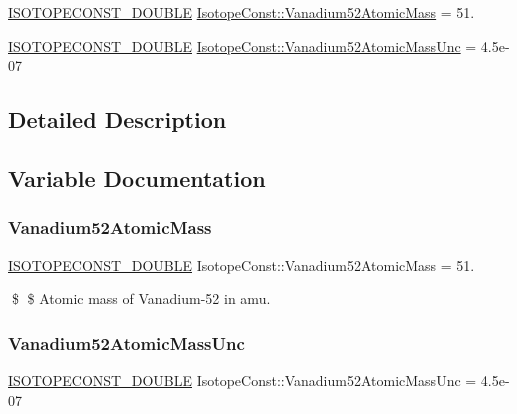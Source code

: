 \begin{DoxyCompactItemize}
\item 
\mbox{\hyperlink{group___isotope_const-_macros_ga8f45a7272ce02c0b4c65c44636ed719a}{I\+S\+O\+T\+O\+P\+E\+C\+O\+N\+S\+T\+\_\+\+D\+O\+U\+B\+LE}} \mbox{\hyperlink{group___isotope_const-_vanadium-_v52_gafeb9e60dd6d3c363b01486417f2a5400}{Isotope\+Const\+::\+Vanadium52\+Atomic\+Mass}} = 51.
\item 
\mbox{\hyperlink{group___isotope_const-_macros_ga8f45a7272ce02c0b4c65c44636ed719a}{I\+S\+O\+T\+O\+P\+E\+C\+O\+N\+S\+T\+\_\+\+D\+O\+U\+B\+LE}} \mbox{\hyperlink{group___isotope_const-_vanadium-_v52_ga74fa348d78ff0257c58e00b7a64ff5d7}{Isotope\+Const\+::\+Vanadium52\+Atomic\+Mass\+Unc}} = 4.\+5e-\/07
\end{DoxyCompactItemize}


\subsection{Detailed Description}


\subsection{Variable Documentation}
\mbox{\label{group___isotope_const-_vanadium-_v52_gafeb9e60dd6d3c363b01486417f2a5400}} 
\subsubsection{\texorpdfstring{Vanadium52\+Atomic\+Mass}{Vanadium52AtomicMass}}
{\footnotesize\ttfamily \mbox{\hyperlink{group___isotope_const-_macros_ga8f45a7272ce02c0b4c65c44636ed719a}{I\+S\+O\+T\+O\+P\+E\+C\+O\+N\+S\+T\+\_\+\+D\+O\+U\+B\+LE}} Isotope\+Const\+::\+Vanadium52\+Atomic\+Mass = 51.}

\$ \$ Atomic mass of Vanadium-\/52 in amu. \mbox{\label{group___isotope_const-_vanadium-_v52_ga74fa348d78ff0257c58e00b7a64ff5d7}} 
\subsubsection{\texorpdfstring{Vanadium52\+Atomic\+Mass\+Unc}{Vanadium52AtomicMassUnc}}
{\footnotesize\ttfamily \mbox{\hyperlink{group___isotope_const-_macros_ga8f45a7272ce02c0b4c65c44636ed719a}{I\+S\+O\+T\+O\+P\+E\+C\+O\+N\+S\+T\+\_\+\+D\+O\+U\+B\+LE}} Isotope\+Const\+::\+Vanadium52\+Atomic\+Mass\+Unc = 4.\+5e-\/07}

